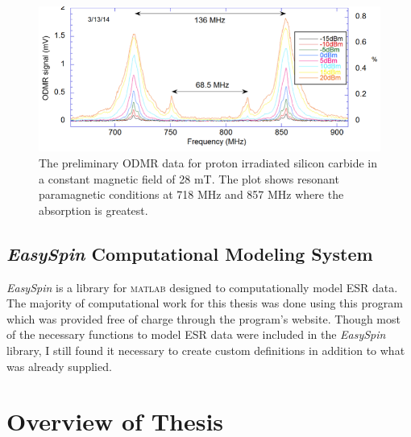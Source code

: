 \documentclass[oneside, noacknowlegments]{BYUPhys}
\begin{document}
\begin{figure}
    \centerline{\includegraphics{prelim_odmr_fig}}
    \caption[Preliminary ODMR Data]{\label{fig:PrelimODMR}
     The preliminary ODMR data for proton irradiated silicon carbide in a constant magnetic field of 28 mT. The plot shows resonant paramagnetic conditions at 718 MHz and 857 MHz where the absorption is greatest. }
\end{figure}

\subsection{\textit{EasySpin} Computational Modeling System}

\textit{EasySpin} \cite{RefWorks:doc:589299fbe4b0dec22aee3bd8} is a library for \textsc{matlab} designed to computationally model ESR data. The majority of computational work for this thesis was done using this program which was provided free of charge through the program's website. Though most of the necessary functions to model ESR data were included in the \textit{EasySpin} library, I still found it necessary to create custom definitions in addition to what was already supplied.

\section{Overview of Thesis}
\end{document}
